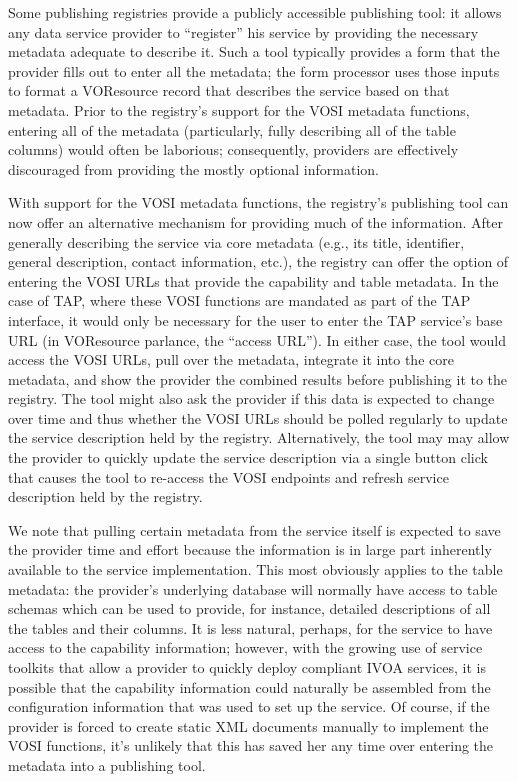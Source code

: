 \documentclass[11pt,letter]{ivoa}
\begin{document}
Some publishing registries \citep{std:RI1} provide a publicly accessible publishing tool: it allows any data service provider to ``register'' his service by providing the necessary metadata adequate to describe it. Such a tool typically provides a form that the provider fills out to enter all the metadata; the form processor uses those inputs to format a VOResource record that describes the service based on that metadata. Prior to the registry's support for the VOSI metadata functions, entering all of the metadata (particularly, fully describing all of the table columns) would often be laborious; consequently, providers are effectively discouraged from providing the mostly optional information.

With support for the VOSI metadata functions, the registry's publishing tool can now offer an alternative mechanism for providing much of the information. After generally describing the service via core metadata (e.g., its title, identifier, general description, contact information, etc.), the registry can offer the option of entering the VOSI URLs that provide the capability and table metadata. In the case of TAP, where these VOSI functions are mandated as part of the TAP interface, it would only be necessary for the user to enter the TAP service's base URL (in VOResource parlance, the ``access URL''). In either case, the tool would access the VOSI URLs, pull over the metadata, integrate it into the core metadata, and show the provider the combined results before publishing it to the registry. The tool might also ask the provider if this data is expected to change over time and thus whether the VOSI URLs should be polled regularly to update the service description held by the registry. Alternatively, the tool may may allow the provider to quickly update the service description via a single button click that causes the tool to re-access the VOSI endpoints and refresh service description held by the registry.

We note that pulling certain metadata from the service itself is expected to save the provider time and effort because the information is in large part inherently available to the service implementation. This most obviously applies to the table metadata: the provider's underlying database will normally have access to table schemas which can be used to provide, for instance, detailed descriptions of all the tables and their columns. It is less natural, perhaps, for the service to have access to the capability information; however, with the growing use of service toolkits that allow a provider to quickly deploy compliant IVOA services, it is possible that the capability information could naturally be assembled from the configuration information that was used to set up the service. Of course, if the provider is forced to create static XML documents manually to implement the VOSI functions, it's unlikely that this has saved her any time over entering the metadata into a publishing tool.
\end{document}
